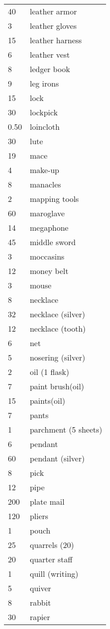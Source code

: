 \begin{normbox}[Equipment]
\begin{tabularx}{\linewidth}{@{} l X }
40 & leather armor\\
3 & leather gloves\\
15 & leather harness\\
6 & leather vest\\
8 & ledger book\\
9 & leg irons\\
15 & lock\\
30 & lockpick\\
0.50 & loincloth\\
30 & lute\\
19 & mace\\
4 & make-up\\
8 & manacles\\
2 & mapping tools\\
60 & maroglave\\
14 & megaphone\\
45 & middle sword\\
3 & moccasins\\
12 & money belt\\
3 & mouse\\
8 & necklace\\
32 & necklace (silver)\\
12 & necklace (tooth)\\
6 & net\\
5 & nosering (silver)\\
2 & oil (1 flask)\\
7 & paint brush(oil)\\
15 & paints(oil)\\
7 & pants\\
1 & parchment (5 sheets)\\
6 & pendant\\
60 & pendant (silver)\\
8 & pick\\
12 & pipe\\
200 & plate mail\\
120 & pliers\\
1 & pouch\\
25 & quarrels (20)\\
20 & quarter staff\\
1 & quill (writing)\\
5 & quiver\\
8 & rabbit\\
30 & rapier\\

\end{tabularx}
\end{normbox}
